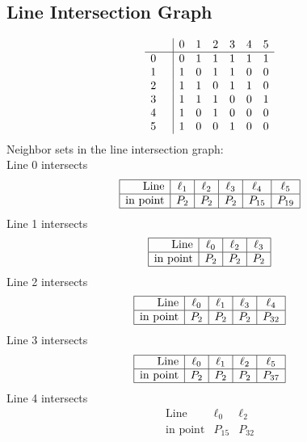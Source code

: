 \documentclass{article}
\begin{document}
{\subsection*{Line Intersection Graph}
{\arraycolsep=1pt
$$
\begin{array}{rr|*{6}r}
 &  & 0 & 1 & 2 & 3 & 4 & 5\\
\hline
0 &  & 0 & 1 & 1 & 1 & 1 & 1\\
1 &  & 1 & 0 & 1 & 1 & 0 & 0\\
2 &  & 1 & 1 & 0 & 1 & 1 & 0\\
3 &  & 1 & 1 & 1 & 0 & 0 & 1\\
4 &  & 1 & 0 & 1 & 0 & 0 & 0\\
5 &  & 1 & 0 & 0 & 1 & 0 & 0\\
\end{array}
$$
}%
Neighbor sets in the line intersection graph:\\
Line 0 intersects 
$$
\begin{array}{|r*{5}{|c}|}
\hline
\mbox{Line}  & \ell_{1} & \ell_{2} & \ell_{3} & \ell_{4} & \ell_{5}\\
\hline
\mbox{in point}  & P_{2} & P_{2} & P_{2} & P_{15} & P_{19}\\
\hline
\end{array}
$$
Line 1 intersects 
$$
\begin{array}{|r*{3}{|c}|}
\hline
\mbox{Line}  & \ell_{0} & \ell_{2} & \ell_{3}\\
\hline
\mbox{in point}  & P_{2} & P_{2} & P_{2}\\
\hline
\end{array}
$$
Line 2 intersects 
$$
\begin{array}{|r*{4}{|c}|}
\hline
\mbox{Line}  & \ell_{0} & \ell_{1} & \ell_{3} & \ell_{4}\\
\hline
\mbox{in point}  & P_{2} & P_{2} & P_{2} & P_{32}\\
\hline
\end{array}
$$
Line 3 intersects 
$$
\begin{array}{|r*{4}{|c}|}
\hline
\mbox{Line}  & \ell_{0} & \ell_{1} & \ell_{2} & \ell_{5}\\
\hline
\mbox{in point}  & P_{2} & P_{2} & P_{2} & P_{37}\\
\hline
\end{array}
$$
Line 4 intersects 
$$
\begin{array}{|r*{2}{|c}|}
\hline
\mbox{Line}  & \ell_{0} & \ell_{2}\\
\hline
\mbox{in point}  & P_{15} & P_{32}\\

\end{array}$$}
\end{document}
